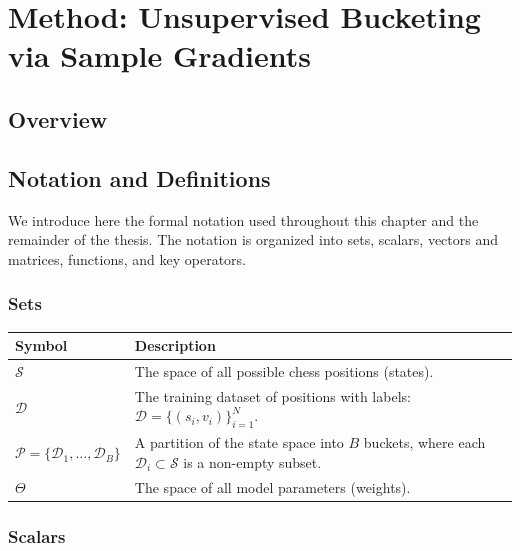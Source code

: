\chapter{Method: Unsupervised Bucketing via Sample Gradients}\label{ch:method}

\section{Overview}\label{sec:method-overview}


\section{Notation and Definitions}\label{sec:notation}

We introduce here the formal notation used throughout this chapter and the remainder of the thesis. The notation is organized into sets, scalars, vectors and matrices, functions, and key operators.

\subsection{Sets}\label{sec:notation-sets}

\begin{center}
\small
\begin{tabularx}{\textwidth}{@{}>{\raggedright\arraybackslash}p{} X@{}}
\hline
\textbf{Symbol} & \textbf{Description} \\
\hline
\(\mathcal{S}\) &
  The space of all possible chess positions (states). \\
\(\mathcal{D}\) &
  The training dataset of positions with labels: \(\mathcal{D} = \{(s_i, v_i)\}_{i=1}^{N}\). \\
\(\mathcal{P} = \{\mathcal{D}_1, \dots, \mathcal{D}_B\}\) &
  A partition of the state space into \(B\) buckets, where each \(\mathcal{D}_i \subset \mathcal{S}\) is a non-empty subset. \\
\(\Theta\) &
  The space of all model parameters (weights). \\
\hline
\end{tabularx}
\end{center}

\subsection{Scalars}\label{sec:notation-scalars}

